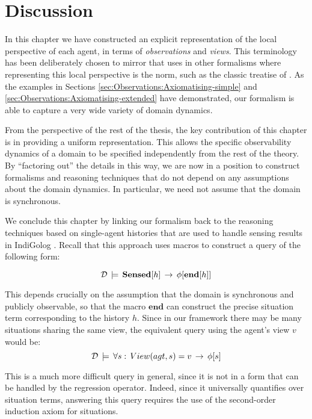 \section{Discussion\label{sec:Observations:Discussion}}

In this chapter we have constructed an explicit representation of
the local perspective of each agent, in terms of \emph{observations}
and \emph{views}. This terminology has been deliberately chosen to
mirror that uses in other formalisms where representing this local
perspective is the norm, such as the classic treatise of \citet{halpern90knowledge_distrib}.
As the examples in Sections \ref{sec:Observations:Axiomatising-simple}
and \ref{sec:Observations:Axiomatising-extended} have demonstrated,
our formalism is able to capture a very wide variety of domain dynamics.

From the perspective of the rest of the thesis, the key contribution
of this chapter is in providing a uniform representation. This allows
the specific observability dynamics of a domain to be specified independently
from the rest of the theory. By {}``factoring out'' the details
in this way, we are now in a position to construct formalisms and
reasoning techniques that do not depend on any assumptions about the
domain dynamics. In particular, we need not assume that the domain
is synchronous.

We conclude this chapter by linking our formalism back to the reasoning
techniques based on single-agent histories that are used to handle
sensing results in IndiGolog \citep{giacomo99indigolog}. Recall that
this approach uses macros to construct a query of the following form:

\[
\mathcal{D}\,\models\,\mathbf{Sensed}[h]\,\rightarrow\,\phi[\mathbf{end}[h]]\]


This depends crucially on the assumption that the domain is synchronous
and publicly observable, so that the macro $\mathbf{end}$ can construct
the precise situation term corresponding to the history $h$. Since
in our framework there may be many situations sharing the same view,
the equivalent query using the agent's view $v$ would be:\[
\mathcal{D}\,\models\,\forall s:\, View(agt,s)=v\,\rightarrow\,\phi[s]\]


This is a much more difficult query in general, since it is not in
a form that can be handled by the regression operator. Indeed, since
it universally quantifies over situation terms, answering this query
requires the use of the second-order induction axiom for situations.


